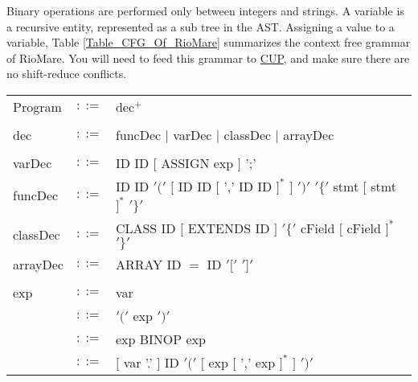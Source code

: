 \documentclass{article}
\begin{document}
Binary operations are performed only between integers and strings.
A variable is a recursive entity, represented as a sub tree in the AST.
Assigning a value to a variable, 
Table \ref{Table_CFG_Of_RioMare} summarizes the context free grammar of RioMare.
You will need to feed this grammar to \href{http://www2.cs.tum.edu/projects/cup/}{CUP},
and make sure there are no shift-reduce conflicts.  
\begin{table}[h]
\centering
\begin{tabular}{ l c l }
Program  & $::=$ & dec$^{+}$ \\
\\
dec      & $::=$ & funcDec $|$ varDec $|$ classDec $|$ arrayDec \\
\\
varDec   & $::=$ & ID ID $[$ ASSIGN exp $]$ ';' \\
funcDec  & $::=$ & ID ID $'('$ $[$ ID ID $[$ ',' ID ID $]^{*}$ $]$ $')'$ %
                   $'\{'$ stmt   $[$ stmt $]^{*}$ $'\}'$                 \\
classDec & $::=$ & CLASS ID $[$ EXTENDS ID $]$ $'\{'$ cField $[$ cField $]^{*}$ $'\}'$ \\
arrayDec & $::=$ & ARRAY ID $=$ ID $'['$ $']'$ \\
\\
exp      & $::=$ & var                                                            \\
         & $::=$ & $'('$ exp $')'$                                                \\
         & $::=$ & exp BINOP exp                                                  \\
         & $::=$ & $[$ var '.' $]$ ID $'('$ $[$ exp $[$ ',' exp $]^{*}$ $]$ $')'$ \\

\end{tabular}
\end{table}
\end{document}
